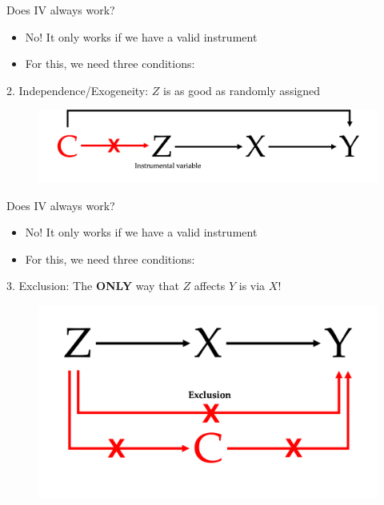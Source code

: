 \documentclass[11pt,xcolor=table]{beamer}
\begin{document}
\begin{frame}{Does IV always work?}

\begin{itemize}
    \item No! It only works if we have a valid instrument
    \item For this, we need three conditions:
\end{itemize}

2. Independence/Exogeneity: $Z$ is as good as randomly assigned

\begin{figure}
\includegraphics[width=\textwidth]{DAGs/iv_independence.png}
\end{figure}

\end{frame}



\begin{frame}{Does IV always work?}

\begin{itemize}
    \item No! It only works if we have a valid instrument
    \item For this, we need three conditions:
\end{itemize}

3. Exclusion: The \textbf{ONLY} way that $Z$ affects $Y$ is via $X$!
\begin{figure}
\includegraphics[width=\textwidth]{DAGs/iv_exclusion.png}
\end{figure}

\end{frame}
\end{document}
